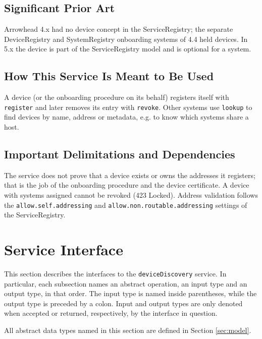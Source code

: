 \documentclass[a4paper]{arrowhead}
\begin{document}
\subsection{Significant Prior Art}

Arrowhead 4.x had no device concept in the ServiceRegistry; the separate DeviceRegistry and SystemRegistry onboarding systems of 4.4 held devices. In 5.x the device is part of the ServiceRegistry model and is optional for a system.

\subsection{How This Service Is Meant to Be Used}

A device (or the onboarding procedure on its behalf) registers itself with \texttt{register} and later removes its entry with \texttt{revoke}. Other systems use \texttt{lookup} to find devices by name, address or metadata, e.g. to know which systems share a host.

\subsection{Important Delimitations and Dependencies}
\label{sec:delimitations}

The service does not prove that a device exists or owns the addresses it registers; that is the job of the onboarding procedure and the device certificate. A device with systems assigned cannot be revoked (423 Locked). Address validation follows the \texttt{allow.\allowbreak{}self.\allowbreak{}addressing} and \texttt{allow.\allowbreak{}non.\allowbreak{}routable.\allowbreak{}addressing} settings of the ServiceRegistry.

\newpage

\section{Service Interface}
\label{sec:operations}

This section describes the interfaces to the \texttt{deviceDiscovery} service.
In particular, each subsection names an abstract operation, an input type and an output type, in that order.
The input type is named inside parentheses, while the output type is preceded by a colon.
Input and output types are only denoted when accepted or returned, respectively, by the interface in question.

All abstract data types named in this section are defined in Section \ref{sec:model}.
\end{document}
